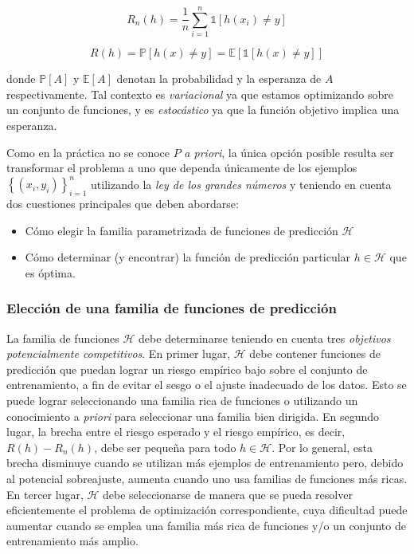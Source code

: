 \begin{equation}
\label{def: Riesgo empirico}
R_n(h) = \frac{1}{n}\sum\limits_{i=1}^{n}{\mathbb{1}\left[ h(x_i) \neq y \right]}
\end{equation}

\begin{equation}
\label{def: riesgo esperado}
R(h)=\mathbb{P}\left[h(x) \neq y \right] = \mathbb{E} \left[\mathbb{1} \left[h(x) \neq y \right] \right]
\end{equation}

donde $\mathbb{P}\left[A \right]$ y $\mathbb{E}\left[A \right]$ denotan la probabilidad y la esperanza de $A$ respectivamente. Tal contexto es \textit{variacional} ya que estamos optimizando sobre un conjunto de funciones, y es \textit{estoc\'astico} ya que la funci\'on objetivo implica una esperanza.

Como en la pr\'actica no se conoce $P$ \textit{a priori}, la \'unica opci\'on posible resulta ser transformar el problema a uno que dependa \'unicamente de los ejemplos $\left\lbrace\left(x_{i},y_{i}\right)\right\rbrace^{n}_{i=1}$ utilizando la \textit{ley de los grandes n\'umeros} y teniendo en cuenta dos cuestiones principales que deben abordarse: 

\begin{itemize}
	\item C\'omo elegir la familia parametrizada de funciones de predicci\'on $\mathcal{H}$
	\item C\'omo determinar (y encontrar) la funci\'on de predicci\'on particular $h \in \mathcal{H}$ que es \'optima.
\end{itemize}

\subsubsection{Elecci\'on de una familia de funciones de predicci\'on}

La familia de funciones $\mathcal{H}$ debe determinarse teniendo en cuenta tres \textit{objetivos potencialmente competitivos}. En primer lugar, $\mathcal{H}$ debe contener funciones de predicci\'on que puedan lograr un riesgo emp\'irico bajo sobre el conjunto de entrenamiento, a fin de evitar el sesgo o el ajuste inadecuado de los datos. Esto se puede lograr seleccionando una familia rica de funciones o utilizando un conocimiento a \textit{priori} para seleccionar una familia bien dirigida. En segundo lugar, la brecha entre el riesgo esperado y el riesgo emp\'irico, es decir, $R(h) - R_n(h)$, debe ser peque\~na para todo $h \in \mathcal{H}$. Por lo general, esta brecha disminuye cuando se utilizan m\'as ejemplos de entrenamiento pero, debido al potencial sobreajuste, aumenta cuando uno usa familias de funciones m\'as ricas. En tercer lugar, $\mathcal{H}$ debe seleccionarse de manera que se pueda resolver eficientemente el problema de optimizaci\'on correspondiente, cuya dificultad puede aumentar cuando se emplea una familia m\'as rica de funciones y/o un conjunto de entrenamiento m\'as amplio.

